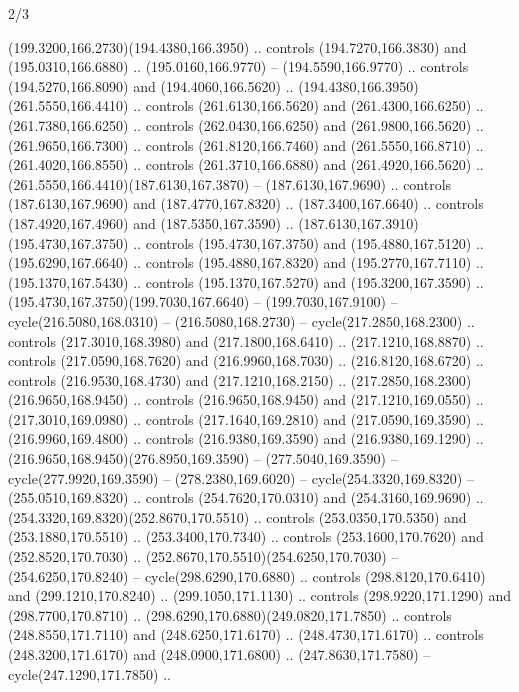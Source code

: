 \begin{flagdescription}{2/3}
\begin{scope}[xshift=0.5\flaglength,yshift=0.5\flagwidth,scale=\flagwidth/259.2]
\begin{scope}[y=0.8pt, x=0.8pt, yscale=-1,shift={(-243,-162)}]
      (199.3200,166.2730)(194.4380,166.3950) .. controls (194.7270,166.3830) and
      (195.0310,166.6880) .. (195.0160,166.9770) -- (194.5590,166.9770) .. controls
      (194.5270,166.8090) and (194.4060,166.5620) ..
      (194.4380,166.3950)(261.5550,166.4410) .. controls (261.6130,166.5620) and
      (261.4300,166.6250) .. (261.7380,166.6250) .. controls (262.0430,166.6250) and
      (261.9800,166.5620) .. (261.9650,166.7300) .. controls (261.8120,166.7460) and
      (261.5550,166.8710) .. (261.4020,166.8550) .. controls (261.3710,166.6880) and
      (261.4920,166.5620) .. (261.5550,166.4410)(187.6130,167.3870) --
      (187.6130,167.9690) .. controls (187.6130,167.9690) and (187.4770,167.8320) ..
      (187.3400,167.6640) .. controls (187.4920,167.4960) and (187.5350,167.3590) ..
      (187.6130,167.3910)(195.4730,167.3750) .. controls (195.4730,167.3750) and
      (195.4880,167.5120) .. (195.6290,167.6640) .. controls (195.4880,167.8320) and
      (195.2770,167.7110) .. (195.1370,167.5430) .. controls (195.1370,167.5270) and
      (195.3200,167.3590) .. (195.4730,167.3750)(199.7030,167.6640) --
      (199.7030,167.9100) -- cycle(216.5080,168.0310) -- (216.5080,168.2730) --
      cycle(217.2850,168.2300) .. controls (217.3010,168.3980) and
      (217.1800,168.6410) .. (217.1210,168.8870) .. controls (217.0590,168.7620) and
      (216.9960,168.7030) .. (216.8120,168.6720) .. controls (216.9530,168.4730) and
      (217.1210,168.2150) .. (217.2850,168.2300)(216.9650,168.9450) .. controls
      (216.9650,168.9450) and (217.1210,169.0550) .. (217.3010,169.0980) .. controls
      (217.1640,169.2810) and (217.0590,169.3590) .. (216.9960,169.4800) .. controls
      (216.9380,169.3590) and (216.9380,169.1290) ..
      (216.9650,168.9450)(276.8950,169.3590) -- (277.5040,169.3590) --
      cycle(277.9920,169.3590) -- (278.2380,169.6020) -- cycle(254.3320,169.8320) --
      (255.0510,169.8320) .. controls (254.7620,170.0310) and (254.3160,169.9690) ..
      (254.3320,169.8320)(252.8670,170.5510) .. controls (253.0350,170.5350) and
      (253.1880,170.5510) .. (253.3400,170.7340) .. controls (253.1600,170.7620) and
      (252.8520,170.7030) .. (252.8670,170.5510)(254.6250,170.7030) --
      (254.6250,170.8240) -- cycle(298.6290,170.6880) .. controls
      (298.8120,170.6410) and (299.1210,170.8240) .. (299.1050,171.1130) .. controls
      (298.9220,171.1290) and (298.7700,170.8710) ..
      (298.6290,170.6880)(249.0820,171.7850) .. controls (248.8550,171.7110) and
      (248.6250,171.6170) .. (248.4730,171.6170) .. controls (248.3200,171.6170) and
      (248.0900,171.6800) .. (247.8630,171.7580) -- cycle(247.1290,171.7850) ..

\end{scope}
\end{scope}
\end{flagdescription}
